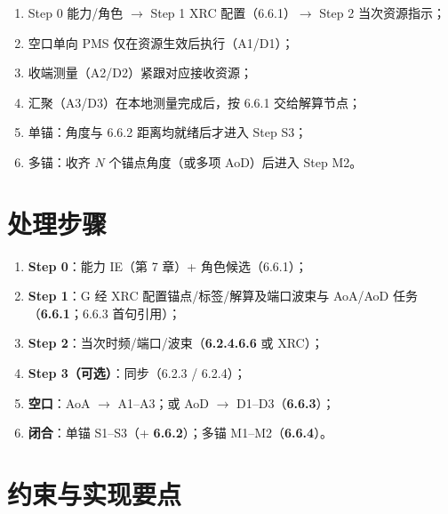 \documentclass[11pt,a4paper]{ctexart}
\begin{document}
\begin{enumerate}[nosep]
  \item Step 0 能力/角色 $\rightarrow$ Step 1 XRC 配置（6.6.1）$\rightarrow$ Step 2 当次资源指示；
  \item 空口单向 PMS 仅在资源生效后执行（A1/D1）；
  \item 收端测量（A2/D2）紧跟对应接收资源；
  \item 汇聚（A3/D3）在本地测量完成后，按 6.6.1 交给解算节点；
  \item 单锚：角度与 6.6.2 距离均就绪后才进入 Step S3；
  \item 多锚：收齐 $N$ 个锚点角度（或多项 AoD）后进入 Step M2。
\end{enumerate}

\section{处理步骤}

\begin{enumerate}[nosep]
  \item \textbf{Step 0}：能力 IE（第 7 章）+ 角色候选（6.6.1）；
  \item \textbf{Step 1}：G 经 XRC 配置锚点/标签/解算及端口波束与 AoA/AoD 任务（\textbf{6.6.1}；6.6.3 首句引用）；
  \item \textbf{Step 2}：当次时频/端口/波束（\textbf{6.2.4.6.6} 或 XRC）；
  \item \textbf{Step 3（可选）}：同步（6.2.3 / 6.2.4）；
  \item \textbf{空口}：AoA $\rightarrow$ A1--A3；或 AoD $\rightarrow$ D1--D3（\textbf{6.6.3}）；
  \item \textbf{闭合}：单锚 S1--S3（+ \textbf{6.6.2}）；多锚 M1--M2（\textbf{6.6.4}）。
\end{enumerate}

\section{约束与实现要点}
\end{document}
